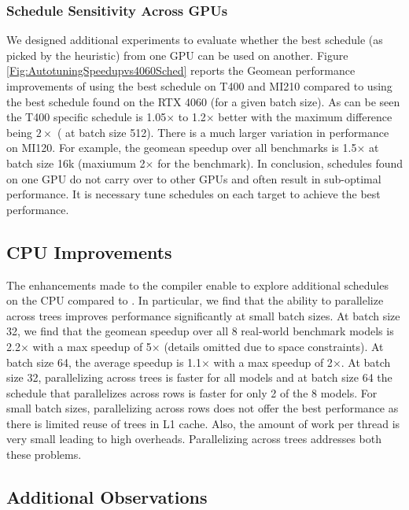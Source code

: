 \subsubsection*{Schedule Sensitivity Across GPUs}
We designed additional experiments to evaluate whether the best schedule (as picked by the heuristic) from one GPU can be used on another.
Figure \ref{Fig:AutotuningSpeedupvs4060Sched} reports the Geomean performance improvements of using the best schedule on T400 and MI210 compared to using the best schedule found on the RTX 4060 (for a given batch size).
As can be seen the T400 specific schedule is 1.05$\times$ to 1.2$\times$ better 
with the maximum difference being $2\times$ ( at batch size 512).
There is a much larger variation in performance on MI120. For example, 
the geomean speedup over all benchmarks is 1.5$\times$ at batch size 16k (maxiumum 2$\times$ for the  benchmark).
In conclusion, schedules found on one GPU do not carry over to other GPUs and often result in sub-optimal performance.
It is necessary tune schedules on each target to achieve the best performance.

\subsection{CPU Improvements}
The enhancements made to the compiler enable \Treebeard{} to explore additional schedules on the CPU
compared to \TreebeardOLD{}. 
In particular, we find that the ability to parallelize across trees improves performance 
significantly at small batch sizes. At batch size 32, we find that the geomean speedup over 
all 8 real-world benchmark models is 2.2$\times$ with a max speedup of 5$\times$ (details omitted 
due to space constraints). At batch size 64, the average speedup
is 1.1$\times$ with a max speedup of 2$\times$. At batch size 32, parallelizing across trees is faster 
for all models and at batch size 64 the \TreebeardOLD{} schedule that parallelizes across 
rows is faster for only 2 of the 8 models. For small batch sizes, parallelizing across rows does 
not offer the best performance as there is limited reuse of trees in L1 cache.
Also, the amount of work per thread is very small leading to high overheads. 
Parallelizing across trees addresses both these problems. 

\subsection{Additional Observations}
